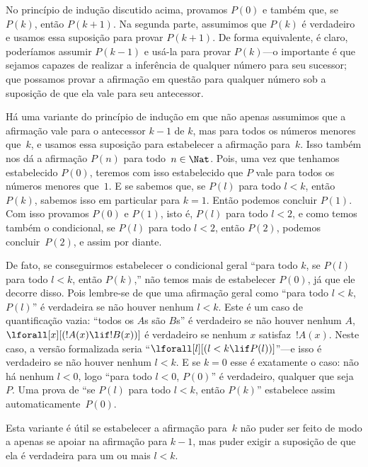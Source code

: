 \documentclass[../../../include/open-logic-section]{subfiles}
\begin{document}


No princípio de indução discutido acima, provamos $P(0)$ e
também que, se $P(k)$, então $P(k+1)$.  Na segunda parte, assumimos que
$P(k)$ é verdadeiro e usamos essa suposição para provar $P(k+1)$.
De forma equivalente, é claro, poderíamos assumir $P(k-1)$ e usá-la para
provar $P(k)$---o importante é que sejamos capazes de realizar a
inferência de qualquer número para seu sucessor; que possamos provar a
afirmação em questão para qualquer número sob a suposição de que ela
vale para seu antecessor.

Há uma variante do princípio de indução em que não apenas assumimos que
a afirmação vale para o antecessor $k-1$ de $k$, mas para todos os
números menores que~$k$, e usamos essa suposição para estabelecer a
afirmação para~$k$. Isso também nos dá a afirmação $P(n)$ para todo~$n
\in \Nat$.  Pois, uma vez que tenhamos estabelecido $P(0)$, teremos com
isso estabelecido que $P$ vale para todos os números menores que~$1$.
E se sabemos que, se $P(l)$ para todo $l<k$, então $P(k)$, sabemos isso
em particular para $k=1$.  Então podemos concluir $P(1)$.  Com isso
provamos $P(0)$ e $P(1)$, isto é, $P(l)$ para todo $l<2$, e como temos
também o condicional, se $P(l)$ para todo $l<2$, então $P(2)$, podemos
concluir~$P(2)$, e assim por diante.

De fato, se conseguirmos estabelecer o condicional geral ``para todo
$k$, se $P(l)$ para todo $l<k$, então $P(k)$,'' não temos mais de
estabelecer $P(0)$, já que ele decorre disso.  Pois lembre-se de que
uma afirmação geral como ``para todo $l<k$, $P(l)$'' é verdadeira se não
houver nenhum $l<k$.  Este é um caso de quantificação vazia: ``todos os
$A$s são $B$s'' é verdadeiro se não houver nenhum $A$,
$\lforall[x][(!A(x) \lif !B(x))]$ é verdadeiro se nenhum $x$
satisfaz~$!A(x)$. Neste caso, a versão formalizada seria
``$\lforall[l][(l < k \lif P(l))]$''---e isso é verdadeiro se não houver
nenhum $l < k$.  E se $k=0$ esse é exatamente o caso: não há nenhum
$l<0$, logo ``para todo $l<0$, $P(0)$'' é verdadeiro, qualquer que
seja $P$.  Uma prova de ``se $P(l)$ para todo $l<k$, então $P(k)$''
estabelece assim automaticamente~$P(0)$.

Esta variante é útil se estabelecer a afirmação para~$k$ não puder ser
feito de modo a apenas se apoiar na afirmação para $k-1$, mas puder
exigir a suposição de que ela é verdadeira para um ou mais $l<k$.
\end{document}
